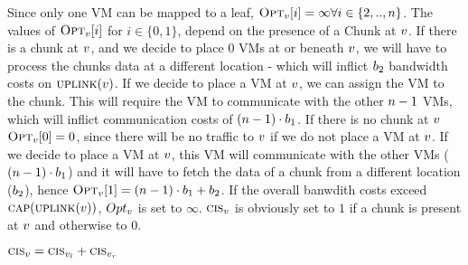 Since only one VM can be mapped to a leaf, $\textsc{Opt}_{v}[i] = 
\infty \forall i \in \{2,..,n\}$. The values of 
$\textsc{Opt}_{v}[i]$ for $i \in \{0,1\}$, depend on the presence of a Chunk 
at $v$. If there is a chunk at $v$, and we decide to 
place $0$ VMs at or beneath $v$, we will have to process the chunks 
data at a different location - which will inflict $b_2$ bandwidth costs 
on $\textsc{uplink}(v)$. If we decide to place a VM at $v$, 
we can assign the VM to the chunk. This will require the VM to communicate with 
the other $n -1$ VMs, which will inflict communication costs of $(n -1) 
\cdot b_1$. If there is no chunk at $v$ 
$\textsc{Opt}_{v}[0] = 0$, since there will be no traffic to 
$v$ if we do not place a VM at $v$. If we decide to 
place a VM at $v$, this VM will communicate with the other VMs 
($(n -1) \cdot b_1$) and it will have to fetch the data of a chunk from 
a different location ($b_2$), hence $\textsc{Opt}_{v}[1] = (n -1 
)\cdot b_1  + b_2$. If the overall banwdith costs exceed 
$\textsc{cap}(\textsc{uplink}(v))$, $Opt_{v}$ is set to $\infty$.
$\textsc{cis}_{v}$ is obviously set to 
$1$ if a 
chunk is present at $v$ and otherwise to $0$.

\newcommand{\SumIndex}{\ensuremath{n}}
\begin{algorithm}[tbhp]
\DontPrintSemicolon %
\SetAlgoNoEnd
{}
$\textsc{cis}_{v} = \textsc{cis}_{v_l} + 
\textsc{cis}_{v_r}$\;
\For{$\SumIndex \in \{0,\dots,\Vms\}$}{
  \For{$i \in \{0,\dots,\SumIndex\}$}{
      \If{$\Opt_\SubstrateNode[\SumIndex] > \Opt_{\SubstrateNode_l}[i] + 
\Opt_{\SubstrateNode_r}[\SumIndex - i]$}{
	$\Opt_\SubstrateNode[\SumIndex] \gets \Opt_{\SubstrateNode_l}[i] + 
\Opt_{\SubstrateNode_r}[\SumIndex - i]$\;
    }
  }
  
 $bw \gets (\Vms - 
\SumIndex) \cdot \SumIndex \cdot \CostCom +   |i - 
\ChunkCount_\SubstrateNode| \cdot \CostTrans$\; 
  \eIf{$bw \leq \Capacity(\Uplink(v))$}{
    $\Opt_\SubstrateNode[\SumIndex] \gets \Opt_\SubstrateNode[\SumIndex] + bw$\;
  }{
    $\Opt_\SubstrateNode[\SumIndex] \gets \infty$\;
  }
}
%
\caption{$aggregate(\SubstrateNode \in \SubstrateNodes)$}
\label{algo:dynAggregation}
\end{algorithm}

